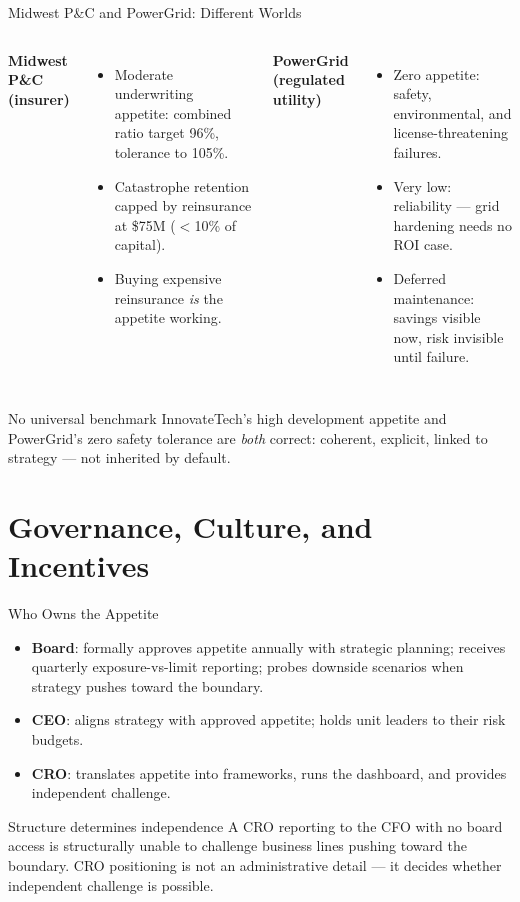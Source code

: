 \documentclass[11pt, aspectratio=169]{beamer}
\begin{document}
\begin{frame}{Midwest P\&C and PowerGrid: Different Worlds}
\begin{columns}[T]
\textbf{Midwest P\&C (insurer)}
\begin{itemize}
  \item Moderate underwriting appetite: combined ratio target 96\%, tolerance to 105\%.
  \item Catastrophe retention capped by reinsurance at \$75M ($<$10\% of capital).
  \item Buying expensive reinsurance \emph{is} the appetite working.
\end{itemize}
\textbf{PowerGrid (regulated utility)}
\begin{itemize}
  \item Zero appetite: safety, environmental, and license-threatening failures.
  \item Very low: reliability --- grid hardening needs no ROI case.
  \item Deferred maintenance: savings visible now, risk invisible until failure.
\end{itemize}
\end{columns}
\medskip
\begin{block}{No universal benchmark}
InnovateTech's high development appetite and PowerGrid's zero safety tolerance are \emph{both} correct: coherent, explicit, linked to strategy --- not inherited by default.
\end{block}
\end{frame}

\section{Governance, Culture, and Incentives}

\begin{frame}{Who Owns the Appetite}
\begin{itemize}
  \item \textbf{Board}: formally approves appetite annually with strategic planning; receives quarterly exposure-vs-limit reporting; probes downside scenarios when strategy pushes toward the boundary.
  \item \textbf{CEO}: aligns strategy with approved appetite; holds unit leaders to their risk budgets.
  \item \textbf{CRO}: translates appetite into frameworks, runs the dashboard, and provides \alert{independent challenge}.
\end{itemize}
\medskip
\begin{block}{Structure determines independence}
A CRO reporting to the CFO with no board access is structurally unable to challenge business lines pushing toward the boundary. CRO positioning is not an administrative detail --- it decides whether independent challenge is possible.
\end{block}
\end{frame}
\end{document}
